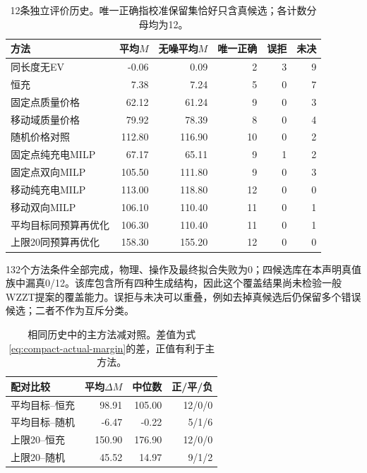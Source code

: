 \documentclass[UTF8,fontset=fandol,11pt,a4paper]{ctexart}
\begin{document}
\begin{table}[htbp]
\centering\small
\caption{12条独立评价历史。唯一正确指校准保留集恰好只含真候选；各计数分母均为12。}
\label{tab:compact-evaluation}
\begin{tabular}{lrrrrr}\toprule
方法 & 平均$M$ & 无噪平均$M$ & 唯一正确 & 误拒 & 未决\\\midrule
同长度无EV & -0.06 & 0.09 & 2 & 3 & 9\\
恒充 & 7.38 & 7.24 & 5 & 0 & 7\\
固定点质量价格 & 62.12 & 61.24 & 9 & 0 & 3\\
移动域质量价格 & 79.92 & 78.39 & 8 & 0 & 4\\
随机价格对照 & 112.80 & 116.90 & 10 & 0 & 2\\
固定点纯充电MILP & 67.17 & 65.11 & 9 & 1 & 2\\
固定点双向MILP & 105.50 & 111.80 & 9 & 0 & 3\\
移动纯充电MILP & 113.00 & 118.80 & 12 & 0 & 0\\
移动双向MILP & 106.10 & 110.40 & 11 & 0 & 1\\
平均目标同预算再优化 & 106.30 & 110.40 & 11 & 0 & 1\\
上限20同预算再优化 & 158.30 & 155.20 & 12 & 0 & 0\\
\bottomrule\end{tabular}
\end{table}

132个方法条件全部完成，物理、操作及最终拟合失败为0；四候选库在本声明真值族中漏真0/12。该库包含所有四种生成结构，因此这个覆盖结果尚未检验一般WZZT提案的覆盖能力。误拒与未决可以重叠，例如去掉真候选后仍保留多个错误候选；二者不作为互斥分类。

\begin{table}[htbp]
\centering\small
\caption{相同历史中的主方法减对照。差值为式\eqref{eq:compact-actual-margin}的差，正值有利于主方法。}
\label{tab:compact-paired}
\begin{tabular}{lrrr}\toprule
配对比较 & 平均$\Delta M$ & 中位数 & 正/平/负\\\midrule
平均目标--恒充 & 98.91 & 105.00 & 12/0/0\\
平均目标--随机 & -6.47 & -0.22 & 5/1/6\\
上限20--恒充 & 150.90 & 176.90 & 12/0/0\\
上限20--随机 & 45.52 & 14.97 & 9/1/2\\
\bottomrule\end{tabular}
\end{table}
\end{document}
